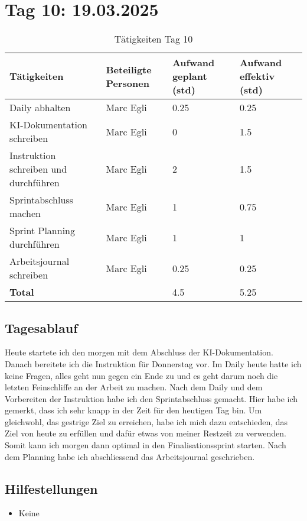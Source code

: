 \section{Tag 10: 19.03.2025}
\begin{table}[H]
    \begin{tabular}{|L{0.4\textwidth}|C{60pt}|C{60pt}|C{60pt}|}
        \hline
        \color{white}Tätigkeiten & \color{white}Beteiligte \color{white}Personen & \color{white}Aufwand geplant (std) & \color{white}Aufwand effektiv (std) \\
        \hline
        Daily abhalten  & Marc Egli & 0.25 & 0.25 \\ 
        \hline
        KI-Dokumentation schreiben & Marc Egli & 0 & 1.5 \\
        \hline
        Instruktion schreiben und durchführen & Marc Egli & 2 & 1.5 \\
        \hline
        Sprintabschluss machen & Marc Egli & 1 & 0.75 \\
        \hline
        Sprint Planning durchführen & Marc Egli & 1 & 1 \\
        \hline
        Arbeitsjournal schreiben & Marc Egli & 0.25 & 0.25 \\
        \hline
        \textbf{Total} &  & 4.5 &  5.25 \\
        \hline
    \end{tabular}
    \caption{Tätigkeiten Tag 10}
\end{table}

\subsection*{Tagesablauf}
Heute startete ich den morgen mit dem Abschluss der KI-Dokumentation. Danach bereitete ich die Instruktion für Donnerstag vor.
Im Daily heute hatte ich keine Fragen, alles geht nun gegen ein Ende zu und es geht darum noch die letzten Feinschliffe an der Arbeit 
zu machen.
Nach dem Daily und dem Vorbereiten der Instruktion habe ich den Sprintabschluss gemacht. Hier habe ich gemerkt, dass ich sehr knapp in der Zeit für den
heutigen Tag bin. Um gleichwohl, das gestrige Ziel zu erreichen, habe ich mich dazu entschieden, das Ziel von heute zu erfüllen und dafür etwas von meiner
Restzeit zu verwenden. Somit kann ich morgen dann optimal in den Finalisationssprint starten. Nach dem Planning habe ich 
abschliessend das Arbeitsjournal geschrieben. 

\subsection*{Hilfestellungen}
\begin{itemize}
    \item Keine
\end{itemize}

